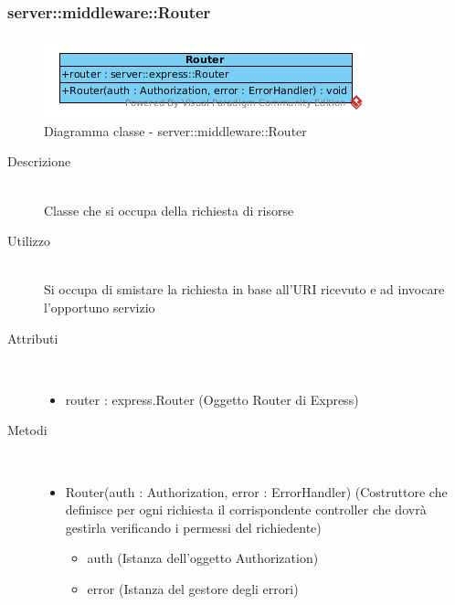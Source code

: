 \subsubsection[Router]{server::middleware::Router}
\begin{center}
			\begin{figure}[H]
				\centering \includegraphics[scale=4, max width=\textwidth, max height=\myheight]{../img/diagrammiClassi/server/middleware/Router.png}
				\caption{Diagramma classe - server::middleware::Router}
			\end{figure}
		\end{center}\begin{description}
\item[Descrizione] \hfill \\
 Classe che si occupa della richiesta di risorse
\item[Utilizzo] \hfill \\
 Si occupa di smistare la richiesta in base all’URI ricevuto e ad invocare l’opportuno servizio
\item[Attributi] \hfill \\
 \vspace{-7mm}
\begin{itemize}
\item router : express.Router (Oggetto Router di Express)
\end{itemize}

\item[Metodi] \hfill \\
 \vspace{-7mm}
\begin{itemize}
\item Router(auth : Authorization, error : ErrorHandler) (Costruttore che definisce per ogni richiesta il corrispondente controller che dovrà gestirla verificando i permessi del richiedente)\begin{itemize}
\item auth (Istanza dell'oggetto Authorization)
\item error (Istanza del gestore degli errori)
\end{itemize}

\end{itemize}

\end{description}

